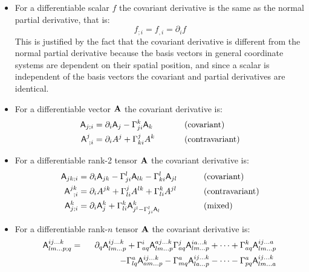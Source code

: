 \begin{df} \mbox{}

 \begin{itemize}
\item   For a differentiable scalar $f$ the covariant derivative
is the same as the normal partial derivative, that is:
\begin{equation}
f_{;i}=f_{,i}=\partial_{i}f
\end{equation}
This is justified by the fact that the covariant derivative is different
from the normal partial derivative because the basis vectors in general
coordinate systems are dependent on their spatial position, and since
a scalar is independent of the basis vectors the covariant and partial
derivatives are identical.

\item For a differentiable vector $\mathbf{ A}$ the covariant
derivative is:
\begin{equation}
\begin{aligned}\mathsf{A}_{j;i} & =\partial_{i}\mathsf{A}_j-\Gamma_{ji}^{k}\mathsf{A}_k & 
\,\,\,\,\,\,\,\,\,\,\,\,\,\,\, & \text{(covariant)}\\
\mathsf{A}_{\,\,;i}^{j} & =\partial_{i}A^{j}+\Gamma_{ki}^{j} A^{k} &  & 
\text{(contravariant)}
\end{aligned}
\end{equation}


\item For a differentiable rank-2 tensor $\mathbf{ A}$ the covariant
derivative is:
\begin{equation}
\begin{aligned}\mathsf{A}_{jk;i} & 
=\partial_{i}\mathsf{A}_{jk}-\Gamma_{ji}^{l}\mathsf{A}_{lk}-\Gamma_{ki}^{l}\mathsf{A}_{jl} & 
\,\,\,\,\,\,\,\,\,\,\,\,\, & \text{(covariant)}\\
\mathsf{A}_{\,\,\,;i}^{jk} & =\partial_{i}A^{jk}+\Gamma_{li}^{j} 
A^{lk}+\Gamma_{li}^{k} A^{jl} &  & \text{(contravariant)}\\
\mathsf{A}_{j;i}^{k} & =\partial_{i}\mathsf{A}_j^{k}+\Gamma_{li}^{k} 
\mathsf{A}_{j^{l}-\Gamma_{ji}^{l} \mathsf{A}_l}^{k} &  & \text{(mixed)}
\end{aligned}
\end{equation}


\item For a differentiable rank-$n$ tensor $\mathbf{ A}$ the
covariant derivative is:
\begin{eqnarray}
\mathsf{A}_{lm\ldots p;q}^{ij\ldots k} & = & \partial_{q}\mathsf{A}_{lm\ldots p}^{ij\ldots 
k}+\Gamma_{aq}^{i} \mathsf{A}_{lm\ldots p}^{aj\ldots k}
\Gamma_{aq}^{j} \mathsf{A}_{lm\ldots p}^{ia\ldots k}+\cdots+\Gamma_{aq}^{k} 
\mathsf{A}_{lm\ldots p}^{ij\ldots a}\\
 &  & \,\,\,\,\,\,\,\,\,\,\,\,\,\,\,\,\,\,\,\,\,\,-\Gamma_{lq}^{a} 
\mathsf{A}_{am\ldots p}^{ij\ldots k}-\Gamma_{mq}^{a} \mathsf{A}_{la\ldots p}^{ij\ldots 
k}-\cdots-\Gamma_{pq}^{a}\mathsf{A}_{lm\ldots a}^{ij\ldots k}\nonumber
\end{eqnarray}



\end{itemize}
\end{df}
